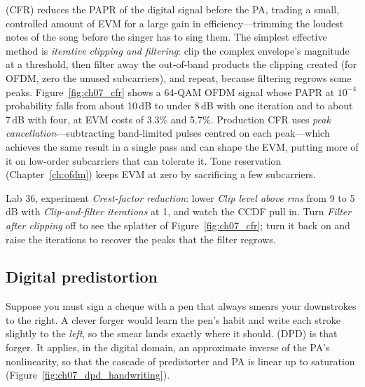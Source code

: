  (CFR) reduces the PAPR of the digital signal before the PA, trading a
small, controlled amount of EVM for a large gain in efficiency---trimming the loudest notes of the song
before the singer has to sing them. The simplest effective method is \emph{iterative clipping and
filtering}: clip the complex envelope's magnitude at a threshold, then filter away the out-of-band
products the clipping created (for OFDM, zero the unused subcarriers), and repeat, because filtering
regrows some peaks. Figure~\ref{fig:ch07_cfr} shows a 64-QAM OFDM signal whose PAPR at $10^{-4}$
probability falls from about 10\,dB to under 8\,dB with one iteration and to about 7\,dB with four, at
EVM costs of 3.3\% and 5.7\%. Production CFR uses \emph{peak cancellation}---subtracting
band-limited pulses centred on each peak---which achieves the same result in a single pass and can shape
the EVM, putting more of it on low-order subcarriers that can tolerate it. Tone reservation (Chapter~\ref{ch:ofdm})
keeps EVM at zero by sacrificing a few subcarriers.


\begin{tryit}
Lab 36, experiment \emph{Crest-factor reduction}: lower \emph{Clip level above rms} from 9 to 5\,dB
with \emph{Clip-and-filter iterations} at 1, and watch the CCDF pull in. Turn \emph{Filter after
clipping} off to see the splatter of Figure~\ref{fig:ch07_cfr}; turn it back on and raise the
iterations to recover the peaks that the filter regrows.
\end{tryit}

\subsection{Digital predistortion}
\label{sec:ch07:dpd}

Suppose you must sign a cheque with a pen that always smears your downstrokes to the right. A clever
forger would learn the pen's habit and write each stroke slightly to the \emph{left}, so the smear
lands exactly where it should.  (DPD) is that forger. It applies, in the
digital domain, an approximate inverse of the PA's nonlinearity, so that the cascade of predistorter and
PA is linear up to saturation (Figure~\ref{fig:ch07_dpd_handwriting}).

